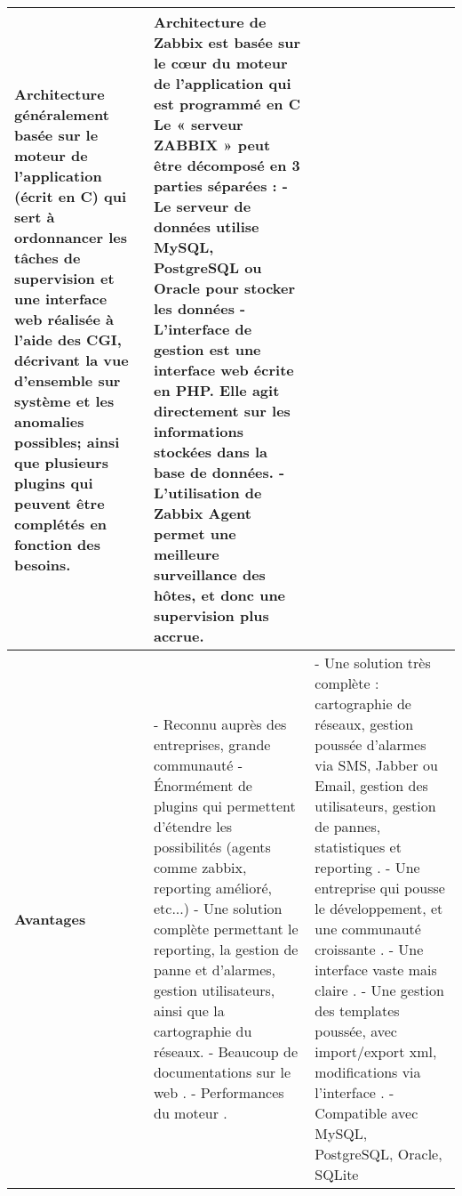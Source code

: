 \begin{tabular}{|p{3cm}|p{7cm}|p{7cm}|}
				Architecture généralement basée sur le moteur de l'application (écrit en C) qui sert à ordonnancer les tâches de supervision et une interface web réalisée à l'aide des CGI, décrivant la vue d'ensemble sur système et les anomalies possibles; ainsi que plusieurs plugins qui peuvent être complétés en fonction des besoins.
				&
				Architecture de  Zabbix est basée sur le cœur du moteur de l'application qui est programmé en C Le « serveur ZABBIX » peut être décomposé en 3 parties séparées : \newline
				- Le serveur de données utilise MySQL, PostgreSQL ou Oracle pour stocker les données \newline
				- L'interface de gestion est une interface web écrite en PHP. Elle agit directement sur les informations stockées dans la base de données. \newline
				- L’utilisation de Zabbix Agent permet une meilleure surveillance des hôtes, et donc une supervision plus accrue.\\
\hline
\bf Avantages & 
				- Reconnu auprès des entreprises, grande communauté \newline
				- Énormément de plugins qui permettent d'étendre les possibilités (agents comme zabbix, reporting amélioré, etc...)\newline
  				- Une solution complète permettant le reporting, la gestion de panne et d'alarmes, gestion utilisateurs, ainsi que la cartographie du réseaux. \newline
  				- Beaucoup de documentations sur le web . \newline
				- Performances du moteur . \newline 
			  &
			  	- Une solution très complète : cartographie de réseaux, gestion poussée d'alarmes via SMS, Jabber ou Email, gestion des utilisateurs, gestion de pannes, statistiques et reporting . \newline
 				- Une entreprise qui pousse le développement, et une communauté croissante . \newline
				- Une interface vaste mais claire . \newline
				- Une gestion des templates poussée, avec import/export xml, modifications via l'interface . \newline
 				- Compatible avec MySQL, PostgreSQL, Oracle, SQLite \\
\hline
				


\end{tabular}
\newpage
